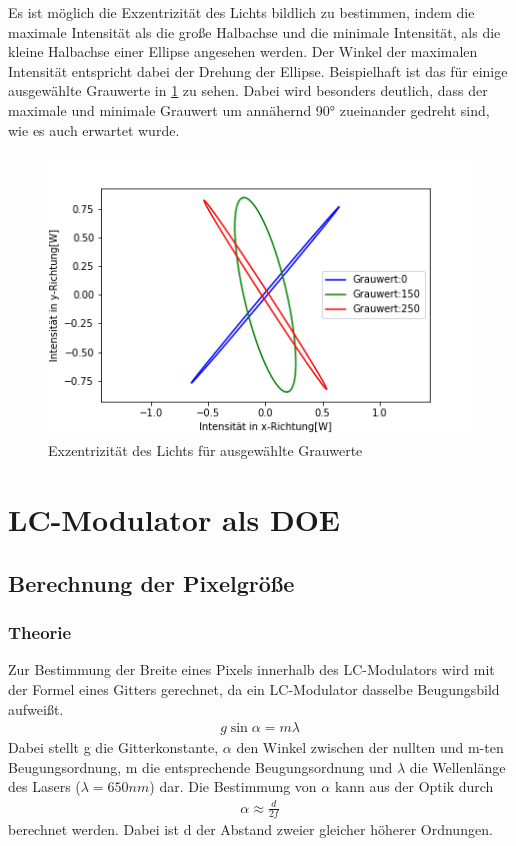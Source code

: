 Es ist möglich die Exzentrizität des Lichts bildlich zu bestimmen, indem die maximale Intensität als die große Halbachse und die minimale Intensität, als die kleine Halbachse einer Ellipse angesehen werden. Der Winkel der maximalen Intensität entspricht dabei der Drehung der Ellipse. Beispielhaft ist das für einige ausgewählte Grauwerte in \cref{Ellipse} zu sehen. Dabei wird besonders deutlich, dass der maximale und minimale Grauwert um annähernd 90° zueinander gedreht sind, wie es auch erwartet wurde.

\begin{figure}[h!]
	\centering
	\includegraphics[scale=0.6]{Ellipse.png}
	\caption{Exzentrizität des Lichts für ausgewählte Grauwerte}
	\label{Ellipse}
\end{figure}





\section{LC-Modulator als DOE}
\subsection{Berechnung der Pixelgröße}
\subsubsection{Theorie}
Zur Bestimmung der Breite eines Pixels innerhalb des LC-Modulators wird mit der Formel eines Gitters gerechnet, da ein LC-Modulator dasselbe Beugungsbild aufweißt.
\begin{align}
	g\sin{\alpha} = m\lambda
	\label{gbestimm}
\end{align}
Dabei stellt g die Gitterkonstante, $\alpha$ den Winkel zwischen der nullten und m-ten Beugungsordnung, m die entsprechende Beugungsordnung und $\lambda$ die Wellenlänge des Lasers ($\lambda = 650nm$) dar.
Die Bestimmung von $\alpha$ kann aus der Optik durch
\begin{align}
	\alpha \approx \frac{d}{2f}
	\label{abestimm}
\end{align}
berechnet werden. Dabei ist d der Abstand zweier gleicher höherer Ordnungen. 
